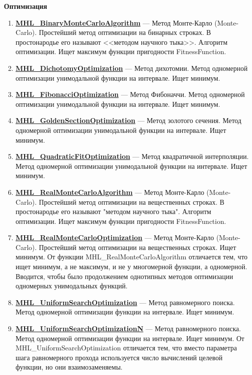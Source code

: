 \documentclass[a4paper,12pt]{article}
\begin{document}
\textbf{Оптимизация}
\begin{enumerate}

\item \textbf{\hyperref[MHL_BinaryMonteCarloAlgorithm]{MHL\_BinaryMonteCarloAlgorithm}} --- Метод Монте-Карло (Monte-Carlo). Простейший метод оптимизации на бинарных строках. В простонародье его называют <<методом научного тыка>>. Алгоритм оптимизации. Ищет максимум функции пригодности FitnessFunction.

\item \textbf{\hyperref[MHL_DichotomyOptimization]{MHL\_DichotomyOptimization}} --- Метод дихотомии. Метод одномерной оптимизации унимодальной функции на интервале. Ищет минимум.

\item \textbf{\hyperref[MHL_FibonacciOptimization]{MHL\_FibonacciOptimization}} --- Метод Фибоначчи. Метод одномерной оптимизации унимодальной функции на интервале. Ищет минимум.

\item \textbf{\hyperref[MHL_GoldenSectionOptimization]{MHL\_GoldenSectionOptimization}} --- Метод золотого сечения. Метод одномерной оптимизации унимодальной функции на интервале. Ищет минимум.

\item \textbf{\hyperref[MHL_QuadraticFitOptimization]{MHL\_QuadraticFitOptimization}} --- Метод квадратичной интерполяции. Метод одномерной оптимизации унимодальной функции на интервале. Ищет минимум.

\item \textbf{\hyperref[MHL_RealMonteCarloAlgorithm]{MHL\_RealMonteCarloAlgorithm}} --- Метод Монте-Карло (Monte-Carlo). Простейший метод оптимизации на вещественных строках. В простонародье его называют "методом научного тыка".
Алгоритм оптимизации. Ищет максимум функции пригодности FitnessFunction.

\item \textbf{\hyperref[MHL_RealMonteCarloOptimization]{MHL\_RealMonteCarloOptimization}} --- Метод Монте-Карло (Monte-Carlo). Простейший метод оптимизации на вещественных строках. Ищет минимум. От функции MHL\_RealMonteCarloAlgorithm отличается тем, что ищет минимум, а не максимум, и не у многомерной функции, а одномерной. Вводится, чтобы было продолжением однотипных методов оптимизации одномерных унимодальных функций.

\item \textbf{\hyperref[MHL_UniformSearchOptimization]{MHL\_UniformSearchOptimization}} --- Метод равномерного поиска. Метод одномерной оптимизации функции на интервале. Ищет минимум.

\item \textbf{\hyperref[MHL_UniformSearchOptimizationN]{MHL\_UniformSearchOptimizationN}} --- Метод равномерного поиска. Метод одномерной оптимизации функции на интервале. Ищет минимум. От MHL\_UniformSearchOptimization отличается тем, что вместо параметра шага равномерного прохода используется число вычислений целевой функции, но они взаимозаменяемы.

\end{enumerate}
\end{document}

